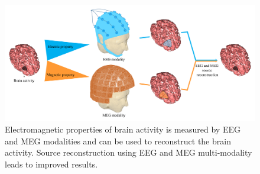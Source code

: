 \begin{figure}[!b]
\centering
\includegraphics[width=1\textwidth]{images/Bimodality.png} %
\caption{Electromagnetic properties of brain activity is measured by EEG and MEG modalities and can be used to reconstruct the brain activity.
Source reconstruction using EEG and MEG multi-modality leads to improved results.
}
\label{fig:Bimodality}
\end{figure}